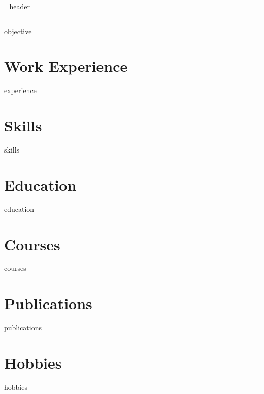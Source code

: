 \documentclass[letter,12pt]{article}
\def\primaryColorToUse{*}
\begin{document}
{_header}


\noindent\rule{16cm}{0.4pt}


{objective}
\vspace*{7pt}





\section{\textcolor{\primaryColorToUse}{Work Experience}}
\vspace*{5pt}
{experience}
\vspace*{7pt}

\section{\textcolor{\primaryColorToUse}{Skills}}
\vspace*{5pt}
{skills}
\vspace*{7pt}

\section{\textcolor{\primaryColorToUse}{Education}}
\vspace*{5pt}
{education}
\vspace*{7pt}

\section{\textcolor{\primaryColorToUse}{Courses}}
\vspace*{5pt}
{courses}
\vspace*{7pt}

\section{\textcolor{\primaryColorToUse}{Publications}}
\vspace*{5pt}
{publications}
\vspace*{7pt}

\section{\textcolor{\primaryColorToUse}{Hobbies}}
{hobbies}
\end{document}
